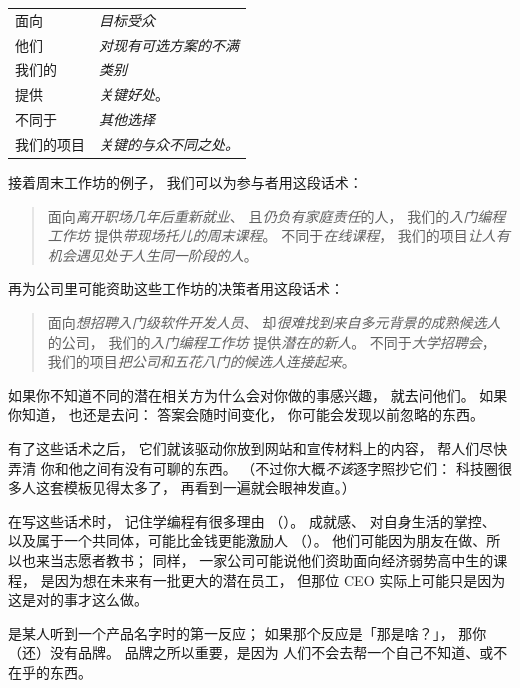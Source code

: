 \newpage
\begin{longtable}{ll}
  面向 & \emph{目标受众} \\
  他们 & \emph{对现有可选方案的不满} \\
  我们的 & \emph{类别} \\
  提供 & \emph{关键好处}。 \\
  不同于 & \emph{其他选择} \\
  我们的项目 & \emph{关键的与众不同之处。}
\end{longtable}

\noindent
接着周末工作坊的例子，
我们可以为参与者用这段话术：

\begin{quote}

  面向\emph{离开职场几年后重新就业}、
  且\emph{仍负有家庭责任}的人，
  我们的\emph{入门编程工作坊}
  提供\emph{带现场托儿的周末课程}。
  不同于\emph{在线课程}，
  我们的项目\emph{让人有机会遇见处于人生同一阶段的人}。

\end{quote}

\noindent
再为公司里可能资助这些工作坊的决策者用这段话术：

\begin{quote}

  面向\emph{想招聘入门级软件开发人员}、
  却\emph{很难找到来自多元背景的成熟候选人}的公司，
  我们的\emph{入门编程工作坊}
  提供\emph{潜在的新人}。
  不同于\emph{大学招聘会}，
  我们的项目\emph{把公司和五花八门的候选人连接起来}。

\end{quote}

如果你不知道不同的潜在相关方为什么会对你做的事感兴趣，
就去问他们。
如果你知道，
也还是去问：
答案会随时间变化，
你可能会发现以前忽略的东西。

有了这些话术之后，
它们就该驱动你放到网站和宣传材料上的内容，
帮人们尽快弄清
你和他之间有没有可聊的东西。
（不过你大概\emph{不该}逐字照抄它们：
科技圈很多人这套模板见得太多了，
再看到一遍就会眼神发直。）

在写这些话术时，
记住学编程有很多理由
（）。
成就感、
对自身生活的掌控、
以及属于一个共同体，可能比金钱更能激励人
（）。
他们可能因为朋友在做、所以也来当志愿者教书；
同样，
一家公司可能说他们资助面向经济弱势高中生的课程，
是因为想在未来有一批更大的潜在员工，
但那位 CEO 实际上可能只是因为这是对的事才这么做。


是某人听到一个产品名字时的第一反应；
如果那个反应是「那是啥？」，
那你（还）没有品牌。
品牌之所以重要，是因为
人们不会去帮一个自己不知道、或不在乎的东西。

